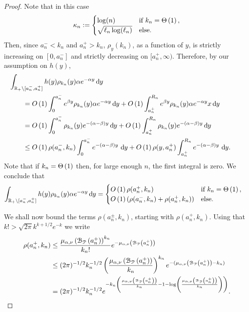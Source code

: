 \begin{proof}
Note that in this case
\[
	\kappa_n := \begin{cases}
		\log(n) &\mbox{if } k_n = \Theta\left(1\right),\\
		\sqrt{\ell_n \log(\ell_n)} &\mbox{else.}
	\end{cases}
\]
Then, since $a_n^- < k_n$ and $a_n^+ > k_n$, $\rho_{y}(k_n)$, as a function of $y$, is strictly increasing on $[0,a_n^-]$ and strictly decreasing on $[a_n^+,\infty)$. Therefore, by our assumption on $h(y)$,
\begin{align*}
	&\hspace{-20pt}\int_{\R_+ \setminus [a_n^-, a_n^+]} h(y) \rho_{k_n}(y) 
		\alpha e^{-\alpha y} \dd y\\
    &= \bigO{1} \int_0^{a_n^-} e^{\beta y} \rho_{k_n}(y) \alpha e^{-\alpha y} \dd y 
    	+ \bigO{1}\int_{a_n^+}^{R_n} e^{\beta y} \rho_{k_n}(y) \alpha e^{-\alpha y}x \dd y \\
    &= \bigO{1} \int_0^{a_n^-} \rho_{k_n}(y) e^{-(\alpha-\beta) y} \dd y 
   		+ \bigO{1} \int_{a_n^+}^{R_n} \rho_{k_n}(y) e^{-(\alpha-\beta) y} \dd y\\
   	&\le \bigO{1}\rho(a_n^-,k_n)\int_0^{a_n^-} e^{-(\alpha-\beta) y} \, \dd y
   		+ \bigO{1} \rho(y,a_n^+) \int_{a_n^+}^{R_n} e^{-(\alpha-\beta) y} \, \dd y.
\end{align*}
Note that if $k_n = \Theta\left(1\right)$ then, for large enough $n$, the first integral is zero. We conclude that
\begin{equation}\label{eq:concentration_lemma_integral_bound}
\begin{aligned}
	\int_{{\mathbb R}_+ \setminus [a_n^-, a_n^+]} h(y) \rho_{k_n}(y) \alpha e^{-\alpha y} \operatorname{\mathrm{d}\hspace{-2pt}} y
	&= \begin{cases}
		O\left(1\right) \rho(a_n^+,k_n) &\mbox{if } k_n = \Theta\left(1\right),\\
		O\left(1\right) \left(\rho(a_n^-,k_n) + \rho(a_n^+,k_n)\right) &\mbox{else.}
	\end{cases}	
\end{aligned}
\end{equation}

We shall now bound the terms $\rho(a_n^\pm,k_n)$, starting with $\rho(a_n^+,k_n)$.  Using that $k! > \sqrt{2\pi} k^{k + 1/2} e^{-k}$ we write
\begin{align*}
	\rho(a_n^+,k_n) &\le \frac{\mu_{\alpha,\nu}\left({\mathcal B}_{{\mathcal P}}\left(a_n^+\right)\right)^{k_n}}{k_n!} e^{-\mu_{\alpha,\nu}\left({\mathcal B}_{{\mathcal P}}\left(a_n^+\right)\right)} \\
	&\le (2\pi)^{-1/2} k_n^{-1/2} \left(\frac{\mu_{\alpha,\nu}\left({\mathcal B}_{{\mathcal P}}\left(a_n^+\right)\right)}{k_n}\right)^{k_n} e^{-(\mu_{\alpha,\nu}\left({\mathcal B}_{{\mathcal P}}\left(a_n^+\right)\right) - k_n)}\\
	&= (2\pi)^{-1/2} k_n^{-1/2} 
		e^{-k_n\left(\frac{\mu_{\alpha,\nu}\left({\mathcal B}_{{\mathcal P}}\left(a_n^+\right)\right)}{k_n} - 1 - \log\left(\frac{\mu_{\alpha,\nu}\left({\mathcal B}_{{\mathcal P}}\left(a_n^+\right)\right)}{k_n}\right)\right)}.
\end{align*}


\end{proof}

